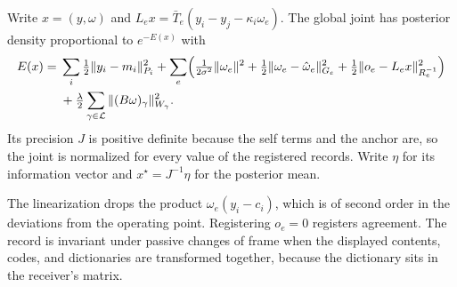 Write $x=(y,\omega)$ and $L_ex=\bar T_e(y_i-y_j-\kappa_i\omega_e)$. The global joint has posterior density proportional to $e^{-E(x)}$ with
\begin{equation}
\begin{aligned}
E(x)={}&\sum_i\tfrac12\Vert y_i-m_i\Vert_{P_i}^2+\sum_e\Bigl(\tfrac1{2\sigma^2}\Vert\omega_e\Vert^2+\tfrac12\Vert\omega_e-\hat\omega_e\Vert_{G_e}^2+\tfrac12\Vert o_e-L_ex\Vert_{R_e^{-1}}^2\Bigr)\\
&+\tfrac\lambda2\sum_{\gamma\in\mathcal L}\Vert(B\omega)_\gamma\Vert_{W_\gamma}^2.
\end{aligned}
\label{it2:global-energy}
\end{equation}
Its precision $J$ is positive definite because the self terms and the anchor are, so the joint is normalized for every value of the registered records. Write $\eta$ for its information vector and $x^\star=J^{-1}\eta$ for the posterior mean.

The linearization drops the product $\omega_e(y_i-c_i)$, which is of second order in the deviations from the operating point. Registering $o_e=0$ registers agreement. The record is invariant under passive changes of frame when the displayed contents, codes, and dictionaries are transformed together, because the dictionary sits in the receiver's matrix.


